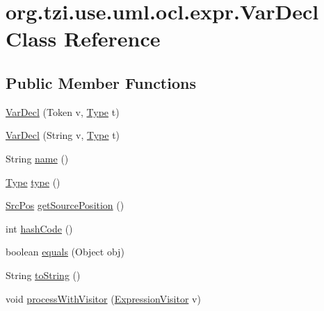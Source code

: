 \hypertarget{classorg_1_1tzi_1_1use_1_1uml_1_1ocl_1_1expr_1_1_var_decl}{\section{org.\-tzi.\-use.\-uml.\-ocl.\-expr.\-Var\-Decl Class Reference}
\label{classorg_1_1tzi_1_1use_1_1uml_1_1ocl_1_1expr_1_1_var_decl}
}
\subsection*{Public Member Functions}
\begin{DoxyCompactItemize}
\item 
\hyperlink{classorg_1_1tzi_1_1use_1_1uml_1_1ocl_1_1expr_1_1_var_decl_a5d9e7a87ea482c846f4d17d2d2828d4c}{Var\-Decl} (Token v, \hyperlink{interfaceorg_1_1tzi_1_1use_1_1uml_1_1ocl_1_1type_1_1_type}{Type} t)
\item 
\hyperlink{classorg_1_1tzi_1_1use_1_1uml_1_1ocl_1_1expr_1_1_var_decl_a95def983a0748f1ccf2ee9d9411e3974}{Var\-Decl} (String v, \hyperlink{interfaceorg_1_1tzi_1_1use_1_1uml_1_1ocl_1_1type_1_1_type}{Type} t)
\item 
String \hyperlink{classorg_1_1tzi_1_1use_1_1uml_1_1ocl_1_1expr_1_1_var_decl_a13635650016a4dceb0ec9ed94a37dc39}{name} ()
\item 
\hyperlink{interfaceorg_1_1tzi_1_1use_1_1uml_1_1ocl_1_1type_1_1_type}{Type} \hyperlink{classorg_1_1tzi_1_1use_1_1uml_1_1ocl_1_1expr_1_1_var_decl_ab1ed889d145b8c1f9b8dda6083bcb40a}{type} ()
\item 
\hyperlink{classorg_1_1tzi_1_1use_1_1parser_1_1_src_pos}{Src\-Pos} \hyperlink{classorg_1_1tzi_1_1use_1_1uml_1_1ocl_1_1expr_1_1_var_decl_a92cbfa5e4bdd3f0338749b9c77b90cf7}{get\-Source\-Position} ()
\item 
int \hyperlink{classorg_1_1tzi_1_1use_1_1uml_1_1ocl_1_1expr_1_1_var_decl_a1519fac4a2bf25f85fb2f091f5973e7c}{hash\-Code} ()
\item 
boolean \hyperlink{classorg_1_1tzi_1_1use_1_1uml_1_1ocl_1_1expr_1_1_var_decl_a84234d555e51201e7322687200f8e0fd}{equals} (Object obj)
\item 
String \hyperlink{classorg_1_1tzi_1_1use_1_1uml_1_1ocl_1_1expr_1_1_var_decl_abd7ba9ead4ce5cbefc49ed8f4092e7e4}{to\-String} ()
\item 
void \hyperlink{classorg_1_1tzi_1_1use_1_1uml_1_1ocl_1_1expr_1_1_var_decl_aa1d0cd6227daacb14b85124877c7b821}{process\-With\-Visitor} (\hyperlink{interfaceorg_1_1tzi_1_1use_1_1uml_1_1ocl_1_1expr_1_1_expression_visitor}{Expression\-Visitor} v)
\end{DoxyCompactItemize}


